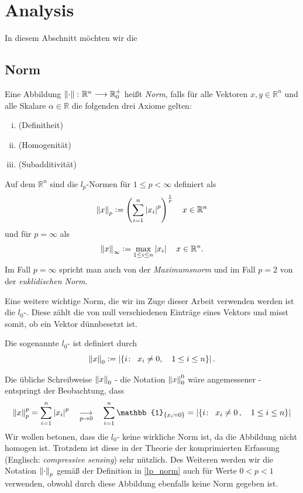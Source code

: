 \section{Analysis}

In diesem Abschnitt möchten wir die 

\subsection{Norm}

\begin{defn}
\label{norm}
Eine Abbildung $\left\lVert \cdot \right\rVert \colon \mathbb{R}^n \longrightarrow {\mathbb {R} }_{0}^{+}$ heißt \textit{Norm}, falls für alle Vektoren $x,y\in \mathbb{R}^n$ und alle Skalare $\alpha \in \mathbb{R}$ die folgenden drei Axiome gelten:
\begin{enumerate}[(i)]
\item {}(Definitheit)
\item {}(Homogenität)
\item {}(Subadditivität)
\end{enumerate}
\end{defn}

\begin{defn} 
\label{lp_norm}
Auf dem $\mathbb{R}^n$ sind die $l_p$-Normen für $1 \leq p < \infty$ definiert als
$$\left\lVert x \right\rVert_p \vcentcolon= \left( \sum_{i=1}^{n} \left\lvert x_i \right\rvert^{p} \right) ^{\frac{1}{p}} \quad x \in \mathbb{R}^{n}$$
und für $p = \infty$ als
$$\left\lVert x \right\rVert_{\infty} \vcentcolon= \max_{1 \leq i \leq n} \left\lvert x_i \right\rvert \quad x \in \mathbb{R}^{n}.$$
Im Fall $p = \infty$ spricht man auch von der \textit{Maximumsnorm} und im Fall $p = 2$ von der \textit{euklidischen Norm}.
\end{defn}

Eine weitere wichtige Norm, die wir im Zuge dieser Arbeit verwenden werden ist die $l_0$-. Diese zählt die von null verschiedenen Einträge eines Vektors und misst somit, ob ein Vektor dünnbesetzt ist.

\begin{defn}
Die sogenannte $l_0$- ist definiert durch
$$\left\lVert x \right\rVert_{0} \vcentcolon= \left|\{i \colon \enspace x_i \neq 0 , \quad 1 \leq i \leq n\}\right|.$$
\end{defn}

Die übliche Schreibweise $\left\lVert x \right\rVert_0$ - die Notation $\left\lVert x \right\rVert_{0}^{0}$ wäre angemessener - entspringt der Beobachtung, dass 
$$\norm{x}_{p}^{p} = \sum_{i=1}^{n} \abs{x_i}^p \quad \underset{p \rightarrow 0}{\longrightarrow} \quad \sum_{i=1}^{n} \mathbb{1}_{\{x_i = 0\}} = \left|\{i \colon \enspace x_i \neq 0\, , \quad 1 \leq i \leq n\}\right|$$
Wir wollen betonen, dass die $l_0$- keine wirkliche Norm ist, da die Abbildung nicht homogen ist. Trotzdem ist diese  in der Theorie der komprimierten Erfassung (Englisch: \textit{compressive sensing}) sehr nützlich. Des Weiteren werden wir die Notation $\left\lVert \cdot \right\rVert_p$ gemäß der Definition in \ref{lp_norm} auch für Werte $0 < p < 1$ verwenden, obwohl durch diese Abbildung ebenfalls keine Norm gegeben ist.

